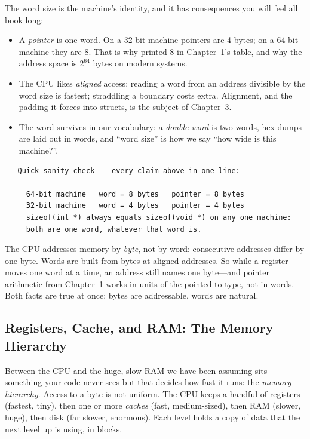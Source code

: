 The word size is the machine's identity, and it has consequences you
will feel all book long:

\begin{itemize}
  \item A \emph{pointer} is one word. On a 32-bit machine pointers are
    4 bytes; on a 64-bit machine they are 8. That is why
     printed 8 in Chapter~1's table, and why the
    address space is $2^{64}$ bytes on modern systems.
  \item The CPU likes \emph{aligned} access: reading a word from an
    address divisible by the word size is fastest; straddling a
    boundary costs extra. Alignment, and the padding it forces into
    structs, is the subject of Chapter~3.
  \item The word survives in our vocabulary: a \emph{double word} is
    two words, hex dumps are laid out in words, and ``word size'' is
    how we say ``how wide is this machine?''.
\end{itemize}

\begin{verbatim}
   Quick sanity check -- every claim above in one line:

     64-bit machine   word = 8 bytes   pointer = 8 bytes
     32-bit machine   word = 4 bytes   pointer = 4 bytes
     sizeof(int *) always equals sizeof(void *) on any one machine:
     both are one word, whatever that word is.
\end{verbatim}

\begin{insight}
The CPU addresses memory by \emph{byte}, not by word: consecutive
addresses differ by one byte. Words are built from bytes at aligned
addresses. So while a register moves one word at a time, an address
still names one byte---and pointer arithmetic from Chapter~1 works in
units of the pointed-to type, not in words. Both facts are true at
once: bytes are addressable, words are natural.
\end{insight}

\subsection{Registers, Cache, and RAM: The Memory Hierarchy}

Between the CPU and the huge, slow RAM we have been assuming sits
something your code never sees but that decides how fast it runs:
the \emph{memory hierarchy}. Access to a byte is not uniform. The CPU
keeps a handful of registers (fastest, tiny), then one or more
\emph{caches} (fast, medium-sized), then RAM (slower, huge), then
disk (far slower, enormous). Each level holds a copy of data that the
next level up is using, in blocks.

